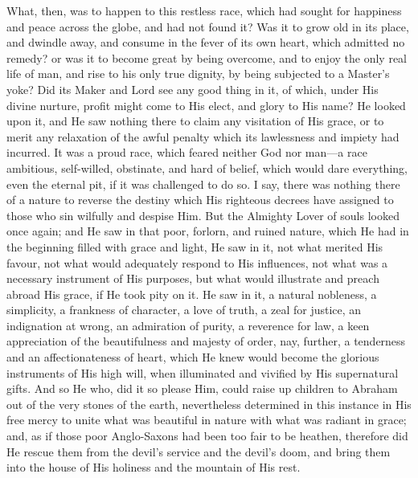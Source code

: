 What, then, was to happen to this restless race, which
had sought for happiness and peace across the globe, and
had not found it? Was it to grow old in its place, and
dwindle away, and consume in the fever of its own heart,
which admitted no remedy? or was it to become great by
being overcome, and to enjoy the only real life of man,
and rise to his only true dignity, by being subjected to
a Master's yoke? Did its Maker and Lord see any good
thing in it, of which, under His divine nurture, profit
might come to His elect, and glory to His name? He looked
upon it, and He saw nothing there to claim any visitation
of His grace, or to merit any relaxation of the awful
penalty which its lawlessness and impiety had incurred.
It was a proud race, which feared neither God nor
man—a race ambitious, self-willed, obstinate, and
hard of belief, which would dare everything, even the
eternal pit, if it was challenged to do so. I say, there
was nothing there of a nature to reverse the destiny
which His righteous decrees have assigned to those who
sin wilfully and despise Him. But the Almighty Lover of
souls looked once again; and He saw in that poor,
forlorn, and ruined nature, which He had in the beginning
filled with grace and light, He saw in it, not what
merited His favour, not what would adequately respond to
His influences, not what was a necessary instrument of
His purposes, but what would illustrate and preach abroad
His grace, if He took pity on it. He saw in it, a natural
nobleness, a simplicity, a frankness of character, a love
of truth, a zeal for justice, an indignation at wrong, an
admiration of purity, a reverence for law, a keen
appreciation of the beautifulness and majesty of order,
nay, further, a tenderness and an affectionateness of
heart, which He knew would become the glorious
instruments of His high will, when illuminated and
vivified by His supernatural gifts. And so He who, did it
so please Him, could raise up children to Abraham out of
the very stones of the earth, nevertheless determined in
this instance in His free mercy to unite what was
beautiful in nature with what was radiant in grace; and,
as if those poor Anglo-Saxons had been too fair to be
heathen, therefore did He rescue them from the devil's
service and the devil's doom, and bring them into the
house of His holiness and the mountain of His rest.

